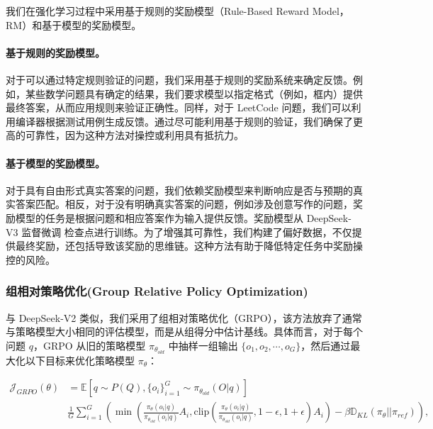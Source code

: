 \documentclass[lang=cn,a4paper,newtx]{elegantpaper}
\newcommand{\dsvii}{DeepSeek-V2}
\newcommand{\dsviii}{DeepSeek-V3}
\begin{document}
我们在强化学习过程中采用基于规则的奖励模型（Rule-Based Reward Model，RM）和基于模型的奖励模型。

\paragraph{基于规则的奖励模型。}
对于可以通过特定规则验证的问题，我们采用基于规则的奖励系统来确定反馈。例如，某些数学问题具有确定的结果，我们要求模型以指定格式（例如，框内）提供最终答案，从而应用规则来验证正确性。同样，对于 LeetCode 问题，我们可以利用编译器根据测试用例生成反馈。通过尽可能利用基于规则的验证，我们确保了更高的可靠性，因为这种方法对操控或利用具有抵抗力。

\paragraph{基于模型的奖励模型。}
对于具有自由形式真实答案的问题，我们依赖奖励模型来判断响应是否与预期的真实答案匹配。相反，对于没有明确真实答案的问题，例如涉及创意写作的问题，奖励模型的任务是根据问题和相应答案作为输入提供反馈。奖励模型从 \dsviii{} 监督微调 检查点进行训练。为了增强其可靠性，我们构建了偏好数据，不仅提供最终奖励，还包括导致该奖励的思维链。这种方法有助于降低特定任务中奖励操控的风险。

\subsubsection{组相对策略优化(Group Relative Policy Optimization)}

与 \dsvii{} 类似，我们采用了组相对策略优化（GRPO），该方法放弃了通常与策略模型大小相同的评估模型，而是从组得分中估计基线。具体而言，对于每个问题 $q$，GRPO 从旧的策略模型 $\pi_{\theta_{old}}$ 中抽样一组输出 $\{o_1, o_2, \cdots, o_G\}$，然后通过最大化以下目标来优化策略模型 $\pi_{\theta}$：

\begin{equation}
\begin{split}
    \mathcal{J}_{GRPO}(\theta) &= \mathbb{E}{[q \sim P(Q), \{o_i\}_{i=1}^G \sim \pi_{\theta_{old}}(O|q)]}  \\
    & \frac{1}{G}\sum_{i=1}^G \left( \min \left( \frac{\pi_\theta(o_i |q)}{\pi_{\theta_{old}}(o_i |q)} A_i, \text{clip} \left( \frac{\pi_\theta(o_i |q)}{\pi_{\theta_{old}}(o_i |q)}, 1 - \epsilon, 1 + \epsilon \right)  A_i \right) - \beta \mathbb{D}_{KL}\left(\pi_{\theta} || \pi_{ref}\right)\right) ,
\end{split}
\label{eq:GRPO-obj}
\end{equation}
\end{document}
